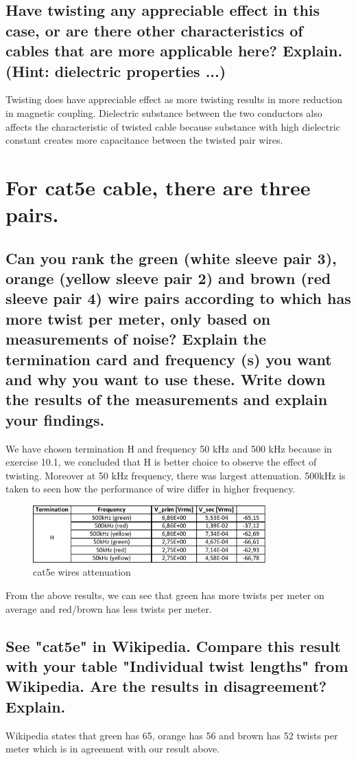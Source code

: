 \documentclass[12pt,a4paper,UKenglish]{article}
\begin{document}
\subsection{Have twisting any appreciable effect in this case, or are there other characteristics of cables that are more applicable here? Explain. (Hint: dielectric properties ...)}
Twisting does have appreciable effect as more twisting results in more reduction in magnetic coupling. Dielectric substance between the two conductors also affects the characteristic of twisted cable because substance with high dielectric constant creates more capacitance between the twisted pair wires.

\section{For cat5e cable, there are three pairs.}
\subsection{Can you rank the green (white sleeve  pair 3), orange (yellow sleeve pair 2) and brown (red sleeve  pair 4) wire pairs according to which has more twist per meter, only based on measurements of noise? Explain the termination card and frequency (s) you want and why you want to use these. Write down the results of the  measurements and explain your findings.}
We have chosen termination H and frequency 50 kHz and 500 kHz because in exercise 10.1, we concluded that H is better choice to observe the effect of twisting. Moreover at 50 kHz frequency, there was largest attenuation. 500kHz is taken to seen how the performance of wire differ in higher frequency. 

\begin{figure} [H] %
  \centering 
  \includegraphics[width=0.8\textwidth]{img/task11a_data.pdf} 
  \caption{cat5e wires attenuation}
  \label{fig:task11a} 
\end{figure}
From the above results, we can see that green has more twists per meter on average and red/brown has less twists per meter.

\subsection{See "cat5e" in Wikipedia. Compare this result with your table "Individual twist lengths" from Wikipedia. Are the results in disagreement? Explain.}
Wikipedia states that green has 65, orange has 56 and brown has 52 twists per meter which is in agreement with our result above.
\end{document}

